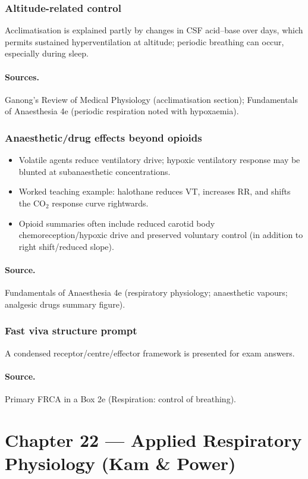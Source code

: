 \documentclass[11pt,a4paper]{article}
\begin{document}
\subsubsection{Altitude-related control}
Acclimatisation is explained partly by changes in CSF acid--base over days, which permits sustained hyperventilation at altitude; periodic breathing can occur, especially during sleep.
\paragraph{Sources.}
Ganong’s Review of Medical Physiology (acclimatisation section); Fundamentals of Anaesthesia 4e (periodic respiration noted with hypoxaemia).

\subsubsection{Anaesthetic/drug effects beyond opioids}
\begin{itemize}
  \item Volatile agents reduce ventilatory drive; hypoxic ventilatory response may be blunted at subanaesthetic concentrations.
  \item Worked teaching example: halothane reduces VT, increases RR, and shifts the CO$_2$ response curve rightwards.
  \item Opioid summaries often include reduced carotid body chemoreception/hypoxic drive and preserved voluntary control (in addition to right shift/reduced slope).
\end{itemize}
\paragraph{Source.}
Fundamentals of Anaesthesia 4e (respiratory physiology; anaesthetic vapours; analgesic drugs summary figure).

\subsubsection{Fast viva structure prompt}
A condensed receptor/centre/effector framework is presented for exam answers.
\paragraph{Source.}
Primary FRCA in a Box 2e (Respiration: control of breathing).


\section{Chapter 22 — Applied Respiratory Physiology (Kam \& Power)}
\end{document}

